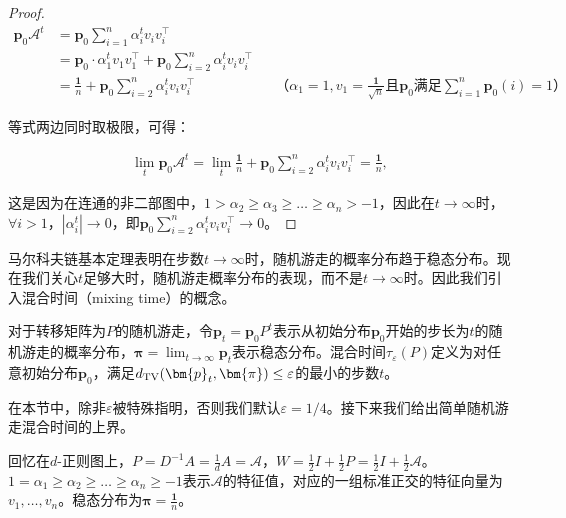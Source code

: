 \documentclass[lang=cn,newtx,10pt,scheme=chinese,chinesefont=nofont,citestyle=gb7714-2015, bibstyle=gb7714-2015]{elegantbook}
\begin{document}
\begin{refsection}
\begin{proof}
        \begin{align*}
            \bm{p}_0\mathcal{A}^t&=\bm{p}_0\sum_{i=1}^n{\alpha_i^tv_iv_i^{\top}}\\
            &=\bm{p}_0\cdot \alpha_1^tv_1v_1^{\top}+\bm{p}_0\sum_{i=2}^n{\alpha_i^tv_iv_i^{\top}}\\
            &=\frac{\bm{1}}{n}+\bm{p}_0\sum_{i=2}^n{\alpha_i^tv_iv_i^{\top}}&&\text{（$\alpha_1=1,v_1=\frac{\bm{1}}{\sqrt{n}}$且$\bm{p}_0$满足$\sum_{i=1}^n\bm{p}_0(i)=1$）}
        \end{align*}

        等式两边同时取极限，可得：
                    
        \begin{align*}
            \lim_t \bm{p}_0\mathcal{A}^t =\lim_t \frac{\bm{1}}{n}+\bm{p}_0\sum_{i=2}^n{\alpha_i^tv_iv_i^{\top}}=\frac{\bm{1}}{n},
        \end{align*}
        
        这是因为在连通的非二部图中，$1>\alpha_2\ge \alpha_3\ge \dots\ge \alpha_n>-1$，因此在$t\to \infty$时，$\forall i>1$，${|\alpha_i^t|}\to 0$，即$\bm{p}_0\sum_{i=2}^n{\alpha_i^tv_iv_i^{\top}}\to 0$。
                    
    \end{proof}

    马尔科夫链基本定理表明在步数$t\to \infty$时，随机游走的概率分布趋于稳态分布。现在我们关心$t$足够大时，随机游走概率分布的表现，而不是$t\to \infty$时。因此我们引入混合时间（mixing time）的概念。

    \begin{definition}[混合时间]
        \label{defn:mixing-time}
        对于转移矩阵为$P$的随机游走，令$\bm{p}_t=\bm{p}_0P^t$表示从初始分布$\bm{p}_0$开始的步长为$t$的随机游走的概率分布，$\bm{\pi}=\lim_{t \to \infty} \bm{p}_t$表示稳态分布。混合时间$\tau_{\varepsilon}(P)$定义为对任意初始分布$\bm{p}_0$，满足$d_{\textup{TV}}(\bm{p}_t,\bm{\pi})\le \varepsilon$的最小的步数$t$。
    \end{definition}

    在本节中，除非$\varepsilon$被特殊指明，否则我们默认$\varepsilon=1/4$。接下来我们给出简单随机游走混合时间的上界。%

    回忆在$d$-正则图上，$P=D^{-1}A=\frac{1}{d}A=\mathcal{A}$，$W=\frac{1}{2}I+\frac{1}{2}P=\frac{1}{2}I+\frac{1}{2}\mathcal{A}$。$1=\alpha_1\ge \alpha_2\ge\dots \ge \alpha_n\ge -1$表示$\mathcal{A}$的特征值，对应的一组标准正交的特征向量为$v_1,\dots,v_n$。稳态分布为$\bm{\pi}=\frac{\bm{1}}{n}$。


\end{refsection}
\end{document}
